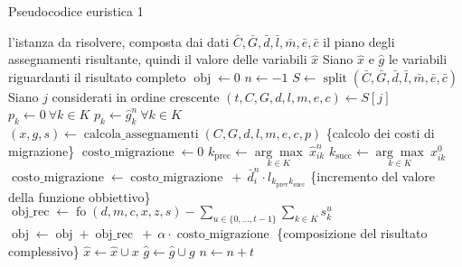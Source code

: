 \begin{algorithm}
    \caption{Pseudocodice euristica 1}
    \label{alg:euristica-sempl}
    \begin{algorithmic}[1]
        \Require l'istanza da risolvere, composta dai dati $\bar{C}, \bar{G}, \bar{d}, \bar{l}, \bar{m}, \bar{e}, \bar{c}$
        \Ensure il piano degli assegnamenti risultante, quindi il valore delle variabili $\hat{x}$
        \State Siano $\hat{x}$ e $\hat{g}$ le variabili riguardanti il risultato completo
        \State $\operatorname{obj} \gets 0$
        \State $n \gets -1$
        \State $S \gets \operatorname{split}(\bar{C}, \bar{G}, \bar{d}, \bar{l}, \bar{m}, \bar{e}, \bar{c})$ \label{algo:l:split}
            \State Siano $j$ considerati in ordine crescente
            \State $(t, C, G, d, l, m, e, c) \gets S[j]$ \label{algo:l:dati1}
             \label{algo:l:p1}
                \State $p_k \gets 0 ~ \forall k \in K$
            \Else
                \State $p_k \gets \hat{g}^n_k ~ \forall k \in K$
            \EndIf
            \State $(x, g, s) \gets \operatorname{calcola\_assegnamenti}(C, G, d, l, m, e, c, p)$ \label{algo:l:calcola-ass}
            \State \{calcolo dei costi di migrazione\}
            \State $\operatorname{costo\_migrazione} \gets 0$
                 \label{algo:l:costi-migr1}
                \State $k_{\operatorname{prec}} \gets \underset{k \in K}{\arg\max} ~ \hat{x}^n_{ik}$
                \State $k_{\operatorname{succ}} \gets \underset{k \in K}{\arg\max} ~ x^0_{ik}$
                        \State $\operatorname{costo\_migrazione} \gets \operatorname{costo\_migrazione} ~ + ~ \bar{d}^n_i \cdot l_{k_{\operatorname{prev}} k_{\operatorname{succ}}}$
                    \EndIf
                \EndFor
            \EndIf
            \State \{incremento del valore della funzione obbiettivo\}
            \State $\operatorname{obj\_rec} \gets \operatorname{fo}(d, m, c, x, z, s) - \sum_{u \in \{0, \dots, t-1\}}\sum_{k \in K} s^u_k$ \label{algo:l:obj1}
            \State $\operatorname{obj} \gets \operatorname{obj} + \operatorname{obj\_rec}  ~ + ~ \alpha \cdot \operatorname{costo\_migrazione}$
            \State \{composizione del risultato complessivo\}
            \State $\hat{x} \gets \hat{x} \cup x$ \label{algo:l:acc1}
            \State $\hat{g} \gets \hat{g} \cup g$
            \State $n \gets n + t$
        \EndFor
    \end{algorithmic}
\end{algorithm}
